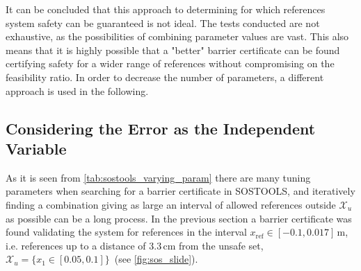 %
%
%

It can be concluded that this approach to determining for which references system safety can be guaranteed is not ideal. The tests conducted are not exhaustive, as the possibilities of combining parameter values are vast. This also means that it is highly possible that a "better" barrier certificate can be found certifying safety for a wider range of references without compromising on the feasibility ratio.
In order to decrease the number of parameters, a different approach is used in the following.

\subsection{Considering the Error as the Independent Variable}\label{sec:sos_1storder_error}

As it is seen from \autoref{tab:sostools_varying_param} there are many tuning parameters when searching for a barrier certificate in SOSTOOLS, and iteratively finding a combination giving as large an interval of allowed references outside $\mathcal{X}_u$ as possible can be a long process. 
In the previous section a barrier certificate was found validating the system for references in the interval $x_\text{ref}\in [-0.1,0.017]$\,m, i.e. references up to a distance of 3.3\,cm from the unsafe set, $\mathcal{X}_u=\{x_1\in[0.05,0.1]\}$\, (see \ref{fig:sos_slide}). 

